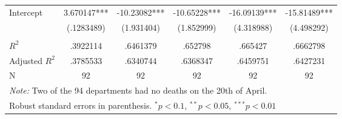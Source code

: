 \documentclass[a4paper]{article}
\theoremstyle{plain}
\theoremstyle{definition}
\begin{document}
\begin{table}[htbp]
\begin{tabular}{l*{5}{c}}
                \\
Intercept   &    3.670147***&   -10.23082***&   -10.65228***&   -16.09139***&   -15.81489***\\
                &  (.1283489)   &  (1.931404)   &  (1.852999)   &  (4.318988)   &  (4.498292)   \\
\\
\hline 
$R^2$              &    .3922114   &    .6461379   &     .652798   &     .665427   &    .6662798   \\
Adjusted $R^2$     &    .3785533   &    .6340744   &    .6368347   &    .6459751   &    .6427231   \\
N               &          92   &          92   &          92   &          92   &          92   \\
\hline\hline 
\multicolumn{6}{l}{\small\textit{Note:} Two of the 94 departments had no deaths on the 20th of April.}    \\
\multicolumn{6}{l}{\small Robust standard errors in parenthesis. $^{*} p<0.1$, $^{**} p < 0.05$, $^{***} p < 0.01$} 
\end{tabular}   
\end{table}
\end{document}
